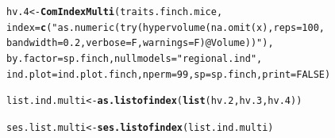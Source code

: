 \documentclass[12pt]{article}\usepackage[]{graphicx}\usepackage[]{color}
\makeatletter
\newcommand{\hlnum}[1]{\textcolor[rgb]{0.686,0.059,0.569}{#1}}%
\newcommand{\hlstr}[1]{\textcolor[rgb]{0.192,0.494,0.8}{#1}}%
\newcommand{\hlstd}[1]{\textcolor[rgb]{0.345,0.345,0.345}{#1}}%
\newcommand{\hlkwb}[1]{\textcolor[rgb]{0.69,0.353,0.396}{#1}}%
\newcommand{\hlkwc}[1]{\textcolor[rgb]{0.333,0.667,0.333}{#1}}%
\newcommand{\hlkwd}[1]{\textcolor[rgb]{0.737,0.353,0.396}{\textbf{#1}}}%
\newenvironment{kframe}{%
 \def\at@end@of@kframe{}%
 \ifinner\ifhmode%
  \def\at@end@of@kframe{\end{minipage}}%
  \begin{minipage}{\columnwidth}%
 \fi\fi%
 \def\FrameCommand##1{\hskip\@totalleftmargin \hskip-\fboxsep
 \colorbox{shadecolor}{##1}\hskip-\fboxsep
     \hskip-\linewidth \hskip-\@totalleftmargin \hskip\columnwidth}%
 \MakeFramed {\advance\hsize-\width
   \@totalleftmargin\z@ \linewidth\hsize
   \@setminipage}}%
 {\par\unskip\endMakeFramed%
 \at@end@of@kframe}
\newenvironment{knitrout}{}{} %
\makeatother
\begin{document}
\begin{knitrout}
\begin{kframe}
\begin{alltt}
\hlstd{hv.4}\hlkwb{<-}\hlkwd{ComIndexMulti}\hlstd{(traits.finch.mice,}
             \hlkwc{index} \hlstd{=} \hlkwd{c}\hlstd{(}\hlstr{"as.numeric(try(hypervolume(na.omit(x), reps = 100, 
                       bandwidth = 0.2, verbose = F, warnings = F)@Volume))"}\hlstd{),}
             \hlkwc{by.factor} \hlstd{= sp.finch,} \hlkwc{nullmodels} \hlstd{=} \hlstr{"regional.ind"}\hlstd{,}
             \hlkwc{ind.plot} \hlstd{= ind.plot.finch,} \hlkwc{nperm} \hlstd{=} \hlnum{99}\hlstd{,} \hlkwc{sp} \hlstd{= sp.finch,} \hlkwc{print} \hlstd{=} \hlnum{FALSE}\hlstd{)}

\hlstd{list.ind.multi}\hlkwb{<-}\hlkwd{as.listofindex}\hlstd{(}\hlkwd{list}\hlstd{(hv.2, hv.3, hv.4))}

\hlstd{ses.list.multi}\hlkwb{<-}\hlkwd{ses.listofindex}\hlstd{(list.ind.multi)}
\end{alltt}
\end{kframe}
\end{knitrout}
\end{document}
